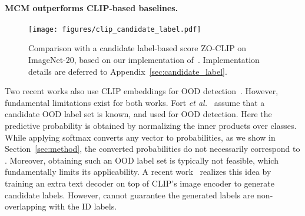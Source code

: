 \documentclass{article}
\begin{document}
\begin{table}[t]
\centering
\caption{\small Performance comparison on  \textbf{hard OOD detection} tasks. MCM is competitive on all three hard OOD tasks without training involved. MSP (based on fine-tuned CLIP) does not further improve performance.}
\vspace{-1mm}
\label{tab:hard}
\end{table}


\vspace{-3mm}
\paragraph{MCM outperforms CLIP-based baselines.} 
\begin{wrapfigure}[15]{r}{0.38\textwidth}
    \small
    \vspace{-4mm}
    \begin{center}
    \texttt{[image: figures/clip\_candidate\_label.pdf]}
    \end{center}
    \vspace{-2.5mm}
    \caption{Comparison with a candidate label-based score ZO-CLIP on ImageNet-20, based on our implementation of~\cite{esmaeilpour2022zero}. Implementation details are deferred to Appendix~\ref{sec:candidate_label}.}
    \vspace{-4mm}
    \label{fig:label_based}
\end{wrapfigure}
Two recent works also use CLIP embeddings for OOD detection~\cite{esmaeilpour2022zero,fort2021exploring}. However, fundamental limitations exist for both works. Fort \emph{et al.}~\cite{fort2021exploring} assume that a candidate OOD label set  is known, and used  for OOD detection. Here the predictive probability  is obtained by normalizing the inner products over  classes. While applying softmax converts any vector to probabilities, as we show in Section~\ref{sec:method}, the converted probabilities do not necessarily correspond to . 
Moreover, obtaining such an OOD label set is typically not feasible, which fundamentally limits its applicability.  A recent work~\cite{esmaeilpour2022zero} realizes this idea by training an extra text decoder on top of CLIP’s image encoder to generate candidate labels.
However, \cite{esmaeilpour2022zero} cannot guarantee the generated labels are non-overlapping with the ID labels. 
\end{document}
